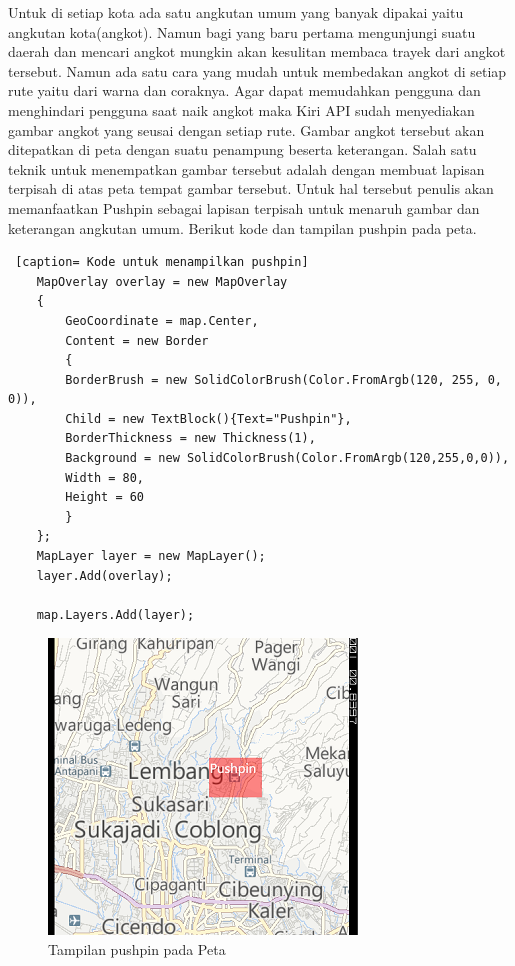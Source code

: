 \hspace{0.5cm} Untuk di setiap kota ada satu angkutan umum yang banyak dipakai yaitu angkutan kota(angkot). Namun bagi yang baru pertama mengunjungi suatu daerah dan mencari angkot mungkin akan kesulitan membaca trayek dari angkot tersebut. Namun ada satu cara yang mudah untuk membedakan angkot di setiap rute yaitu dari warna dan coraknya. Agar dapat memudahkan pengguna dan menghindari pengguna saat naik angkot maka Kiri API sudah menyediakan gambar angkot yang seusai dengan setiap rute. Gambar angkot tersebut akan ditepatkan di peta dengan suatu penampung beserta keterangan. Salah satu teknik untuk menempatkan gambar tersebut adalah dengan membuat lapisan terpisah di atas peta tempat gambar tersebut. Untuk hal tersebut penulis akan memanfaatkan Pushpin sebagai lapisan terpisah untuk menaruh gambar dan keterangan angkutan umum. Berikut kode dan tampilan pushpin pada peta.

\begin{lstlisting} [caption= Kode untuk menampilkan pushpin]
	MapOverlay overlay = new MapOverlay
	{
		GeoCoordinate = map.Center,
		Content = new Border
		{
		BorderBrush = new SolidColorBrush(Color.FromArgb(120, 255, 0, 0)),
		Child = new TextBlock(){Text="Pushpin"},
		BorderThickness = new Thickness(1),
		Background = new SolidColorBrush(Color.FromArgb(120,255,0,0)),
		Width = 80,
		Height = 60
		}
	};
	MapLayer layer = new MapLayer();
	layer.Add(overlay);

	map.Layers.Add(layer);
\end{lstlisting}

\begin{figure}[h]
	\centering
		\includegraphics[scale=0.5]{Gambar/kontrol/pushpin}
	\caption{Tampilan pushpin pada Peta}
	\label{fig:Tampilan pushpin pada Peta}
\end{figure}


